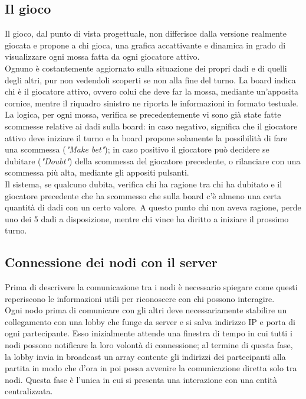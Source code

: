 \documentclass{llncs}
\begin{document}
	\subsection{Il gioco}
	Il gioco, dal punto di vista progettuale, non differisce dalla versione realmente giocata e propone a chi gioca, una grafica accattivante e dinamica in grado di visualizzare ogni mossa fatta da ogni giocatore attivo.\\
	Ognuno è costantemente aggiornato sulla situazione dei propri dadi e di quelli degli altri, pur non vedendoli scoperti se non alla fine del turno. La board indica chi è il giocatore attivo, ovvero colui che deve far la mossa, mediante un'apposita cornice, mentre il riquadro sinistro ne riporta le informazioni in formato testuale.\\
	La logica, per ogni mossa, verifica se precedentemente vi sono già state fatte scommesse relative ai dadi sulla board: in caso negativo, significa che il giocatore attivo deve iniziare il turno e la board propone solamente la possibilità di fare una scommessa (\textit{"Make bet"}); in caso positivo il giocatore può decidere se dubitare (\textit{"Doubt"}) della scommessa del giocatore precedente, o rilanciare con una scommessa più alta, mediante gli appositi pulsanti.\\
	Il sistema, se qualcuno dubita, verifica chi ha ragione tra chi ha dubitato e il giocatore precedente che ha scommesso che sulla board c'è almeno una certa quantità di dadi con un certo valore. A questo punto chi non aveva ragione, perde uno dei 5 dadi a disposizione, mentre chi vince ha diritto a iniziare il prossimo turno.\\

	\subsection{Connessione dei nodi con il server}
	Prima di descrivere la comunicazione tra i nodi è necessario spiegare come questi reperiscono le informazioni utili per riconoscere con chi possono interagire. \\
	Ogni nodo prima di comunicare con gli altri deve necessariamente stabilire un collegamento con una lobby che funge da server e si salva indirizzo IP e porta di ogni partecipante. Esso inizialmente attende una finestra di tempo in cui tutti i nodi possono notificare la loro volontà di connessione; al termine di questa fase, la lobby invia in broadcast un array contente gli indirizzi dei partecipanti alla partita in modo che d'ora in poi possa avvenire la comunicazione diretta solo tra nodi. Questa fase è l'unica in cui si presenta una interazione con una entità centralizzata. 
\end{document}

